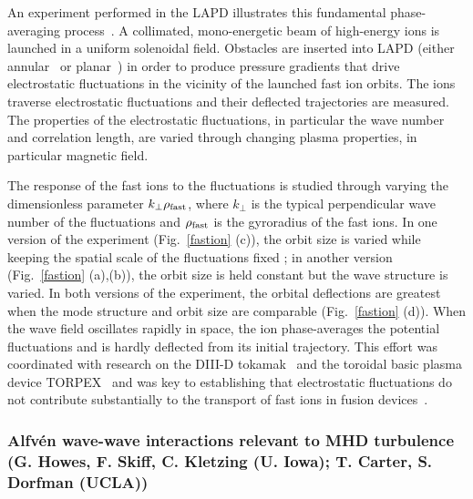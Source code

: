 \documentclass[11pt]{article}
\renewcommand{\cite}{\citep}
\begin{document}
An experiment performed in the
LAPD illustrates this fundamental
phase-averaging process~\cite{zhou:2010,zhou:2012a, zhou:2012b, heidbrink:2012}. A collimated, mono-energetic beam
of high-energy ions is launched in a uniform solenoidal field.
Obstacles are inserted into LAPD (either annular~\cite{zhou:2012a} or
planar~\cite{carter:2006}) in order to produce pressure gradients that drive
electrostatic fluctuations in the vicinity of the launched fast ion
orbits.  The ions traverse electrostatic fluctuations and their
deflected trajectories are measured.  The properties of the
electrostatic fluctuations, in particular the wave number and
correlation length, are varied through changing plasma properties, in
particular magnetic field.  

The response of the fast ions to the fluctuations is studied through
varying the dimensionless parameter $k_\perp \rho_{\rm fast}$, where
$k_\perp$ is the typical perpendicular wave number of the fluctuations
and $\rho_{\rm fast}$ is the gyroradius of the fast ions.  
In one version of the experiment (Fig.~\ref{fastion} (c)), the orbit size is varied
while keeping the spatial scale of the fluctuations fixed ; in another version (Fig.~\ref{fastion} (a),(b)), the
orbit size is held constant but the wave structure is varied.  In both
versions of the experiment, the orbital deflections are greatest when
the mode structure and orbit size are comparable (Fig.~\ref{fastion} (d)).  When
the wave field oscillates rapidly in space, the ion phase-averages the potential
fluctuations and is hardly deflected from its initial trajectory.
This effort was coordinated with research on the DIII-D tokamak~\cite{pace:2013} and
the toroidal basic plasma device TORPEX~\cite{heidbrink:2012,bovet:2012} and was key to establishing
that electrostatic fluctuations do not contribute substantially to the
transport of fast ions in fusion devices~\cite{pace:2013}.


\subsubsection{Alfv\'{e}n wave-wave interactions relevant to MHD turbulence (G.
Howes, F. Skiff, C. Kletzing (U. Iowa); T. Carter, S. Dorfman (UCLA))}
\end{document}

